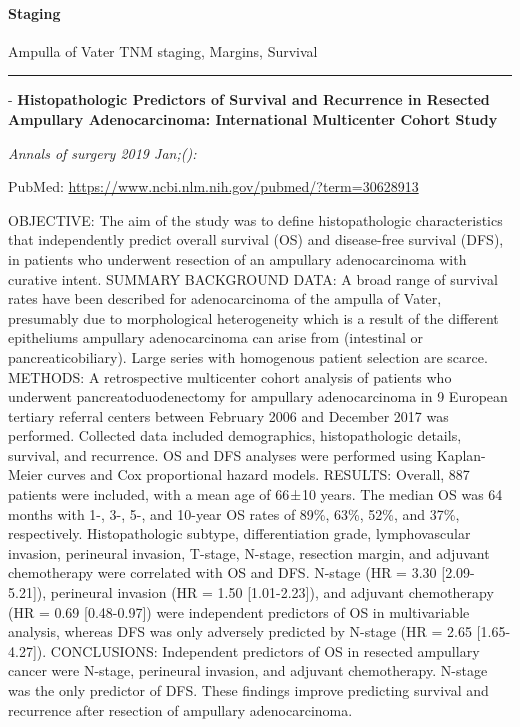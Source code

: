 \documentclass[]{article}
\let\oldparagraph\paragraph
\renewcommand{\paragraph}[1]{\oldparagraph{#1}\mbox{}}
\begin{document}
\hypertarget{staging-3}{%
\paragraph{Staging}\label{staging-3}}

Ampulla of Vater TNM staging, Margins, Survival

\begin{center}\rule{0.5\linewidth}{\linethickness}\end{center}

 - \textbf{Histopathologic Predictors of Survival and Recurrence in
Resected Ampullary Adenocarcinoma: International Multicenter Cohort
Study}

\emph{Annals of surgery 2019 Jan;():}

PubMed: \url{https://www.ncbi.nlm.nih.gov/pubmed/?term=30628913}

OBJECTIVE: The aim of the study was to define histopathologic
characteristics that independently predict overall survival (OS) and
disease-free survival (DFS), in patients who underwent resection of an
ampullary adenocarcinoma with curative intent. SUMMARY BACKGROUND DATA:
A broad range of survival rates have been described for adenocarcinoma
of the ampulla of Vater, presumably due to morphological heterogeneity
which is a result of the different epitheliums ampullary adenocarcinoma
can arise from (intestinal or pancreaticobiliary). Large series with
homogenous patient selection are scarce. METHODS: A retrospective
multicenter cohort analysis of patients who underwent
pancreatoduodenectomy for ampullary adenocarcinoma in 9 European
tertiary referral centers between February 2006 and December 2017 was
performed. Collected data included demographics, histopathologic
details, survival, and recurrence. OS and DFS analyses were performed
using Kaplan-Meier curves and Cox proportional hazard models. RESULTS:
Overall, 887 patients were included, with a mean age of 66 ± 10 years.
The median OS was 64 months with 1-, 3-, 5-, and 10-year OS rates of
89\%, 63\%, 52\%, and 37\%, respectively. Histopathologic subtype,
differentiation grade, lymphovascular invasion, perineural invasion,
T-stage, N-stage, resection margin, and adjuvant chemotherapy were
correlated with OS and DFS. N-stage (HR = 3.30 {[}2.09-5.21{]}),
perineural invasion (HR = 1.50 {[}1.01-2.23{]}), and adjuvant
chemotherapy (HR = 0.69 {[}0.48-0.97{]}) were independent predictors of
OS in multivariable analysis, whereas DFS was only adversely predicted
by N-stage (HR = 2.65 {[}1.65-4.27{]}). CONCLUSIONS: Independent
predictors of OS in resected ampullary cancer were N-stage, perineural
invasion, and adjuvant chemotherapy. N-stage was the only predictor of
DFS. These findings improve predicting survival and recurrence after
resection of ampullary adenocarcinoma.
\end{document}
